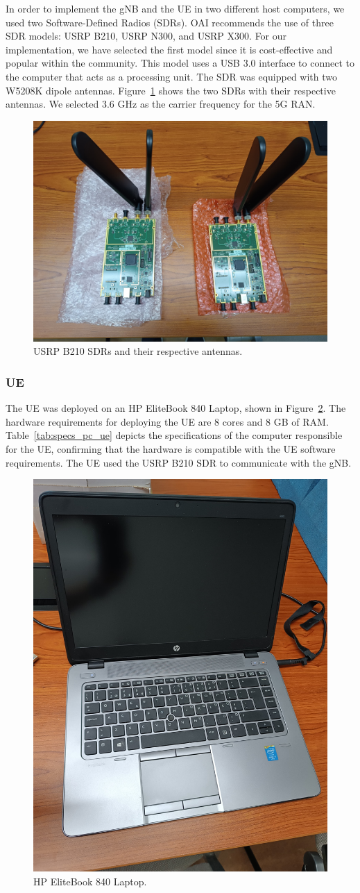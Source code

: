 In order to implement the gNB and the UE in two different host computers, we used two Software-Defined Radios (SDRs).
OAI recommends the use of three SDR models: USRP B210, USRP N300, and USRP X300\@ \cite{openairinterface_tutorial}.
For our implementation, we have selected the first model since it is cost-effective and popular within the community.
This model uses a USB 3.0 interface to connect to the computer that acts as a processing unit.
The SDR was equipped with two W5208K dipole antennas.
Figure~\ref{fig:SDRs} shows the two SDRs with their respective antennas.
We selected 3.6 GHz as the carrier frequency for the 5G RAN\@.

\begin{figure}[H]
    \centering
    \includegraphics[width=0.5\linewidth]{figures/SDRs}
    \caption{USRP B210 SDRs and their respective antennas.}
    \label{fig:SDRs}
\end{figure}



\subsubsection{UE}
The UE was deployed on an HP EliteBook 840 Laptop, shown in Figure~\ref{fig:computer_hp}.
The hardware requirements for deploying the UE are 8 cores and 8 GB of RAM\@.
Table~\ref{tab:specs_pc_ue} depicts the specifications of the computer responsible for the UE\@, confirming that the hardware is compatible with the UE software requirements.
The UE used the USRP B210 SDR to communicate with the gNB\@.

\begin{figure}[H]
    \centering
    \includegraphics[width=0.3\linewidth]{figures/hp}
    \caption{HP EliteBook 840 Laptop.}
    \label{fig:computer_hp}
\end{figure}

